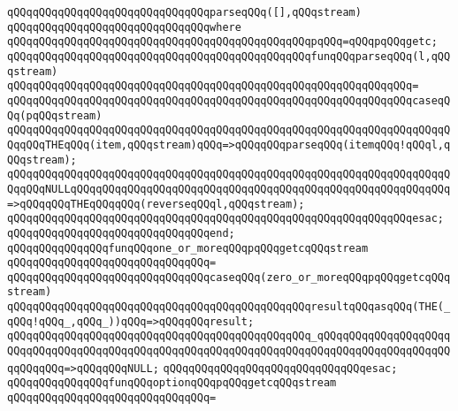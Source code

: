 \verb|qQQqqQQqqQQqqQQqqQQqqQQqqQQqqQQqparseqQQq([],qQQqstream)|\newline
\verb|qQQqqQQqqQQqqQQqqQQqqQQqqQQqqQQqwhere|\newline
\verb|qQQqqQQqqQQqqQQqqQQqqQQqqQQqqQQqqQQqqQQqqQQqqQQqpqQQq=qQQqpqQQqgetc;|\newline
\newline
\verb|qQQqqQQqqQQqqQQqqQQqqQQqqQQqqQQqqQQqqQQqqQQqqQQqfunqQQqparseqQQq(l,qQQqstream)|\newline
\verb|qQQqqQQqqQQqqQQqqQQqqQQqqQQqqQQqqQQqqQQqqQQqqQQqqQQqqQQqqQQqqQQq=|\newline
\verb|qQQqqQQqqQQqqQQqqQQqqQQqqQQqqQQqqQQqqQQqqQQqqQQqqQQqqQQqqQQqqQQqcaseqQQq(pqQQqstream)|\newline
\verb|qQQqqQQqqQQqqQQqqQQqqQQqqQQqqQQqqQQqqQQqqQQqqQQqqQQqqQQqqQQqqQQqqQQqqQQqqQQqTHEqQQq(item,qQQqstream)qQQq=>qQQqqQQqparseqQQq(itemqQQq!qQQql,qQQqstream);|\newline
\verb|qQQqqQQqqQQqqQQqqQQqqQQqqQQqqQQqqQQqqQQqqQQqqQQqqQQqqQQqqQQqqQQqqQQqqQQqqQQqNULLqQQqqQQqqQQqqQQqqQQqqQQqqQQqqQQqqQQqqQQqqQQqqQQqqQQqqQQqqQQq=>qQQqqQQqTHEqQQqqQQq(reverseqQQql,qQQqstream);|\newline
\verb|qQQqqQQqqQQqqQQqqQQqqQQqqQQqqQQqqQQqqQQqqQQqqQQqqQQqqQQqqQQqqQQqesac;|\newline
\verb|qQQqqQQqqQQqqQQqqQQqqQQqqQQqqQQqend;|\newline
\newline
\newline
\verb|qQQqqQQqqQQqqQQqfunqQQqone_or_moreqQQqpqQQqgetcqQQqstream|\newline
\verb|qQQqqQQqqQQqqQQqqQQqqQQqqQQqqQQq=|\newline
\verb|qQQqqQQqqQQqqQQqqQQqqQQqqQQqqQQqcaseqQQq(zero_or_moreqQQqpqQQqgetcqQQqstream)|\newline
\verb|qQQqqQQqqQQqqQQqqQQqqQQqqQQqqQQqqQQqqQQqqQQqqQQqresultqQQqasqQQq(THE(_qQQq!qQQq_,qQQq_))qQQq=>qQQqqQQqresult;|\newline
\verb|qQQqqQQqqQQqqQQqqQQqqQQqqQQqqQQqqQQqqQQqqQQqqQQq_qQQqqQQqqQQqqQQqqQQqqQQqqQQqqQQqqQQqqQQqqQQqqQQqqQQqqQQqqQQqqQQqqQQqqQQqqQQqqQQqqQQqqQQqqQQqqQQqqQQq=>qQQqqQQqNULL;|\newline
\verb|qQQqqQQqqQQqqQQqqQQqqQQqqQQqqQQqesac;|\newline
\newline
\newline
\verb|qQQqqQQqqQQqqQQqfunqQQqoptionqQQqpqQQqgetcqQQqstream|\newline
\verb|qQQqqQQqqQQqqQQqqQQqqQQqqQQqqQQq=|\newline
